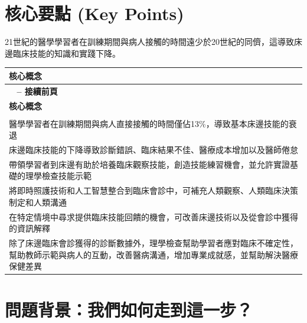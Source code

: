 \documentclass[12pt,a4paper]{article}
\newcommand{\note}[1]{
    \par
    \noindent
    \begin{tcolorbox}[
        colback=emergency_blue!5!white,
        colframe=emergency_blue,
        title=\textbf{重點提醒},
        fonttitle=\bfseries,
        boxrule=0.5pt,
        arc=3pt,
        left=6pt,
        right=6pt,
        top=6pt,
        bottom=6pt
    ]
    #1
    \end{tcolorbox}
}
\begin{document}
\section{核心要點 (Key Points)}

\note{21世紀的醫學學習者在訓練期間與病人接觸的時間遠少於20世紀的同儕，這導致床邊臨床技能的知識和實踐下降。}

\begin{longtable}{>{\raggedright\arraybackslash}p{15cm}}
\toprule
\textbf{\textcolor{emergency_blue}{核心概念}} \\
\midrule
\endfirsthead

\multicolumn{1}{c}%
{{\bfseries \tablename\ \thetable{} -- 接續前頁}} \\
\toprule
\textbf{\textcolor{emergency_blue}{核心概念}} \\
\midrule
\endhead

\midrule \multicolumn{1}{r}{{接續下頁}} \\ \midrule
\endfoot

\bottomrule
\endlastfoot

醫學學習者在訓練期間與病人直接接觸的時間僅佔13\%，導致基本床邊技能的衰退 \\

床邊臨床技能的下降導致診斷錯誤、臨床結果不佳、醫療成本增加以及醫師倦怠 \\

帶領學習者到床邊有助於培養臨床觀察技能，創造技能練習機會，並允許實證基礎的理學檢查技能示範 \\

將即時照護技術和人工智慧整合到臨床會診中，可補充人類觀察、人類臨床決策制定和人類溝通 \\

在特定情境中尋求提供臨床技能回饋的機會，可改善床邊技術以及從會診中獲得的資訊解釋 \\

除了床邊臨床會診獲得的診斷數據外，理學檢查幫助學習者應對臨床不確定性，幫助教師示範與病人的互動，改善醫病溝通，增加專業成就感，並幫助解決醫療保健差異 \\
\end{longtable}

\section{問題背景：我們如何走到這一步？}
\end{document}

